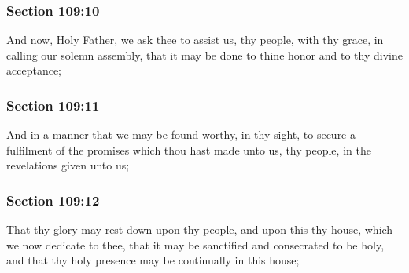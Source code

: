 	\subsubsection{Section 109:10} %
		\label{DC109-10}

		And now, Holy Father, we ask thee to assist us, thy people, with thy grace, in calling our solemn assembly, that it may be done to thine honor and to thy divine acceptance;


	\subsubsection{Section 109:11} %
		\label{DC109-11}

		And in a manner that we may be found worthy, in thy sight, to secure a fulfilment of the promises which thou hast made unto us, thy people, in the revelations given unto us;


	\subsubsection{Section 109:12} %
		\label{DC109-12}

		That thy glory may rest down upon thy people, and upon this thy house, which we now dedicate to thee, that it may be sanctified and consecrated to be holy, and that thy holy presence may be continually in this house;


